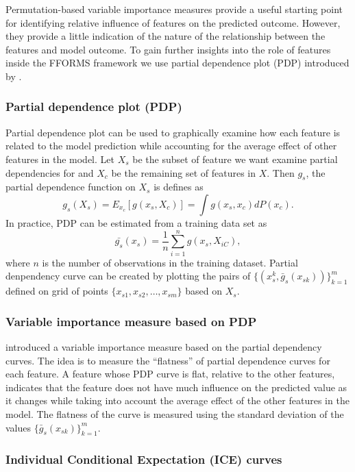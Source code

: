 \documentclass[11pt,a4paper,]{article}
\theoremstyle{definition}
\theoremstyle{definition}
\theoremstyle{definition}
\theoremstyle{remark}
\begin{document}
Permutation-based variable importance measures provide a useful starting
point for identifying relative influence of features on the predicted
outcome. However, they provide a little indication of the nature of the
relationship between the features and model outcome. To gain further
insights into the role of features inside the FFORMS framework we use
partial dependence plot (PDP) introduced by
\textcite{friedman2008predictive}.

\subsubsection{Partial dependence plot
(PDP)}\label{partial-dependence-plot-pdp}

Partial dependence plot can be used to graphically examine how each
feature is related to the model prediction while accounting for the
average effect of other features in the model. Let \(X_s\) be the subset
of feature we want examine partial dependencies for and \(X_c\) be the
remaining set of features in \(X\). Then \(g_s\), the partial dependence
function on \(X_s\) is defines as
\[g_s(X_s)=E_{x_c}[g(x_s, X_c)]=\int{g(x_s, x_c)dP(x_c).}\] In practice,
PDP can be estimated from a training data set as
\[\bar{g_s}(x_s)=\frac{1}{n}\sum_{i=1}^{n}g(x_s, X_{iC}),\] where \(n\)
is the number of observations in the training dataset. Partial
denpendency curve can be created by plotting the pairs of
\(\{(x_s^k, \bar{g}_s(x_{sk}))\}_{k=1}^{m}\) defined on grid of points
\(\{x_{s1}, x_{s2},\dots, x_{sm}\}\) based on \(X_s\).

\subsubsection{Variable importance measure based on
PDP}\label{variable-importance-measure-based-on-pdp}

\textcite{Greenwell2018} introduced a variable importance measure based
on the partial dependency curves. The idea is to measure the
``flatness'' of partial dependence curves for each feature. A feature
whose PDP curve is flat, relative to the other features, indicates that
the feature does not have much influence on the predicted value as it
changes while taking into account the average effect of the other
features in the model. The flatness of the curve is measured using the
standard deviation of the values \(\{\bar{g}_{s}(x_{sk})\}_{k=1}^{m}\).

\subsubsection{Individual Conditional Expectation (ICE)
curves}\label{individual-conditional-expectation-ice-curves}
\end{document}
